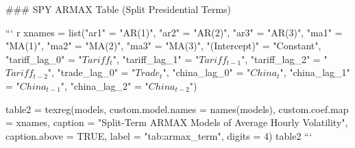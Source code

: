 \documentclass[
]{article}
\begin{document}
{\begin{appendix}
### SPY ARMAX Table (Split Presidential Terms)

\centering 


``` r
xnames = list("ar1" = "AR(1)",
              "ar2" = "AR(2)",
              "ar3" = "AR(3)",
              "ma1" = "MA(1)",
              "ma2" = "MA(2)",
              "ma3" = "MA(3)",
              "(Intercept)" = "Constant",
              "tariff_lag_0" = "$Tariff_{t}$",
              "tariff_lag_1" = "$Tariff_{t-1}$",
              "tariff_lag_2" = "$Tariff_{t-2}$",
              "trade_lag_0" = "$Trade_{t}$",
              "china_lag_0" = "$China_{t}$",
              "china_lag_1" = "$China_{t-1}$",
              "china_lag_2" = "$China_{t-2}$")

table2 = texreg(models,
       custom.model.names = names(models), 
       custom.coef.map = xnames,
       caption = "Split-Term ARMAX Models of Average Hourly Volatility",
       caption.above = TRUE,
       label = "tab:armax_term",
       digits = 4)
table2
```



\end{appendix}}
\end{document}
